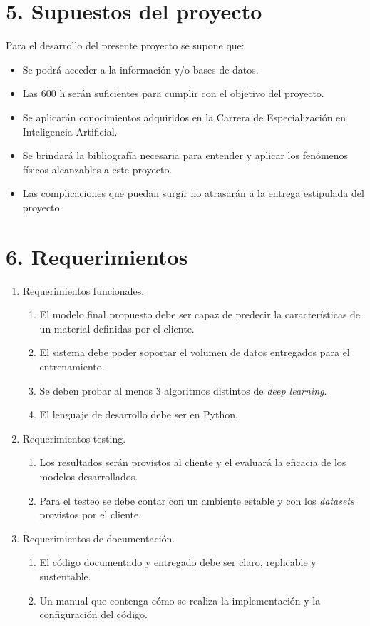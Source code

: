 \documentclass[
11pt, %
codirector, %
]{charter}
\begin{document}
\section{5. Supuestos del proyecto}
\label{sec:supuestos}


Para el desarrollo del presente proyecto se supone que:

\begin{itemize}
	\item Se podrá acceder a la información y/o bases de datos.
	\item Las 600 h serán suficientes para cumplir con el objetivo del proyecto.
	\item Se aplicarán conocimientos adquiridos en la Carrera de Especialización en Inteligencia Artificial.
	\item Se brindará la bibliografía necesaria para entender y aplicar los fenómenos físicos alcanzables a este proyecto.
	\item Las complicaciones que puedan surgir no atrasarán a la entrega estipulada del proyecto.
\end{itemize}


\section{6. Requerimientos}

\label{sec:requerimientos}

\begin{enumerate}
	\item Requerimientos funcionales.
		\begin{enumerate}
			\item El modelo final propuesto debe ser capaz de predecir la características
			de un material definidas por el cliente.
			\item El sistema debe poder soportar el volumen de datos entregados para el
			entrenamiento.
			\item Se deben probar al menos 3 algoritmos distintos de \textit{deep learning}.
			\item El lenguaje de desarrollo debe ser en Python.
		\end{enumerate}
	\item Requerimientos testing.
		\begin{enumerate}
			\item Los resultados serán provistos al cliente y el evaluará la eficacia de los
			modelos desarrollados.
			\item  Para el testeo se debe contar con un ambiente estable y con los 
			\textit{datasets} provistos por el cliente. 
		\end{enumerate}
	\item Requerimientos de documentación.
		\begin{enumerate}
			\item El código documentado y entregado debe ser claro, replicable y sustentable.
			\item Un manual que contenga cómo se realiza
			la implementación y la configuración del código.
		\end{enumerate}
\end{enumerate}
\end{document}
